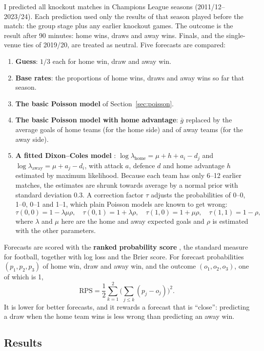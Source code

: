 \documentclass[11pt,a4paper]{article}
\begin{document}
I predicted all \nKO{} knockout matches in \nSeasons{} Champions League seasons (2011/12--2023/24). Each prediction used only the results of that season played before the match: the group stage plus any earlier knockout games. The outcome is the result after 90 minutes: \nHome{} home wins, \nDraw{} draws and \nAway{} away wins. Finals, and the single-venue ties of 2019/20, are treated as neutral. Five forecasts are compared:
\begin{enumerate}
\item \textbf{Guess}: $1/3$ each for home win, draw and away win.
\item \textbf{Base rates}: the proportions of home wins, draws and away wins so far that season.
\item \textbf{The basic Poisson model} of Section~\ref{sec:poisson}.
\item \textbf{The basic Poisson model with home advantage}: $\bar g$ replaced by the average goals of home teams (for the home side) and of away teams (for the away side).
\item \textbf{A fitted Dixon--Coles model} \cite{dixoncoles}: $\log\lambda_{\text{home}} = \mu + h + a_i - d_j$ and $\log\lambda_{\text{away}} = \mu + a_j - d_i$, with attack $a$, defence $d$ and home advantage $h$ estimated by maximum likelihood. Because each team has only 6--12 earlier matches, the estimates are shrunk towards average by a normal prior with standard deviation 0.3. A correction factor $\tau$ adjusts the probabilities of 0--0, 1--0, 0--1 and 1--1, which plain Poisson models are known to get wrong:
\[
\tau(0,0) = 1-\lambda\mu\rho,\quad \tau(0,1) = 1+\lambda\rho,\quad \tau(1,0) = 1+\mu\rho,\quad \tau(1,1) = 1-\rho ,
\]
where $\lambda$ and $\mu$ here are the home and away expected goals and $\rho$ is estimated with the other parameters.
\end{enumerate}

Forecasts are scored with the \textbf{ranked probability score} \cite{epstein, constantinou}, the standard measure for football, together with log loss and the Brier score. For forecast probabilities $(p_1,p_2,p_3)$ of home win, draw and away win, and the outcome $(o_1,o_2,o_3)$, one of which is 1,
\[
\text{RPS} = \frac{1}{2}\sum_{k=1}^{2}\Big(\sum_{j\le k}(p_j - o_j)\Big)^2 .
\]
It is lower for better forecasts, and it rewards a forecast that is ``close'': predicting a draw when the home team wins is less wrong than predicting an away win.

\subsection{Results}
\end{document}
